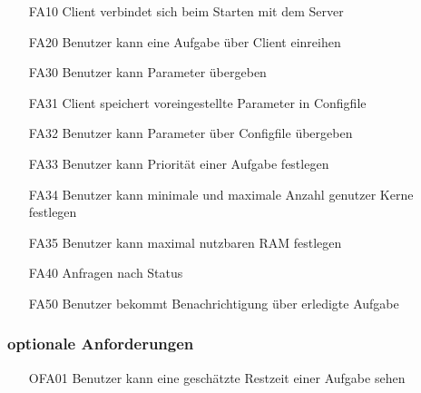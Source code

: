 \documentclass[a4paper,12pt]{article}
\begin{document}
\begin{itemize}[nosep]
\leftskip=0.5cm

\begin{comment}

\begin{minipage}[t]{\linewidth}
\item[FA00] \textbf{<Titel>}
\subitem \textbf{Erklärung} <In ca. 3 Zeilen eine grobe Beschreibung geben>
\subitem \textbf{Wichtigkeit} <entweder Kern-Funktionalität oder Optionale-Funktionalität>
\subitem \textbf{Vorraussetzungen} <Wann ist diese Funktion nutzbar?> <dieser Punkt kann weggelassen werden>
\subitem \textbf{Nachbedingung} <Dieser Punkt kann weggelassen werden>
\subsubitem \textbf{Erfolg} <Was geschieht wenn diese Funktion erfolgreich ausgeführt wurde>
\subsubitem \textbf{Misserfolg} <Was geschieht wenn diese Funktion nicht ausgeführt werden kann>
\subitem \textbf{Auslöser} <Wie wird diese Funktion gestartet> <Dieser Punkt kann weggelassen werden>
\subitem \textbf{Details} <Ausführliche Beschreibung dieser funktionalen Anforderung>
\end{minipage}
\pagebreak

\end{comment}

\item[FA10]	\gls{Client} verbindet sich beim Starten mit dem Server
\item[FA20] Benutzer kann eine Aufgabe über \gls{Client} einreihen
\item[FA30] Benutzer kann Parameter übergeben %
\item[FA31]	\gls{Client} speichert voreingestellte Parameter in \gls{Configfile}
\item[FA32]	Benutzer kann Parameter über \gls{Configfile} übergeben
\item[FA33] Benutzer kann Priorität einer Aufgabe festlegen %
\item[FA34] Benutzer kann minimale und maximale Anzahl genutzer Kerne festlegen %
\item[FA35] Benutzer kann maximal nutzbaren RAM festlegen %
\item[FA40] Anfragen nach Status
\item[FA50] Benutzer bekommt Benachrichtigung über erledigte Aufgabe 
\end{itemize}

\subsubsection{optionale Anforderungen}
\begin{itemize}[nosep]
\leftskip=0.5cm
\item[OFA01] Benutzer kann eine geschätzte Restzeit einer Aufgabe sehen	
\end{itemize}
\end{document}
